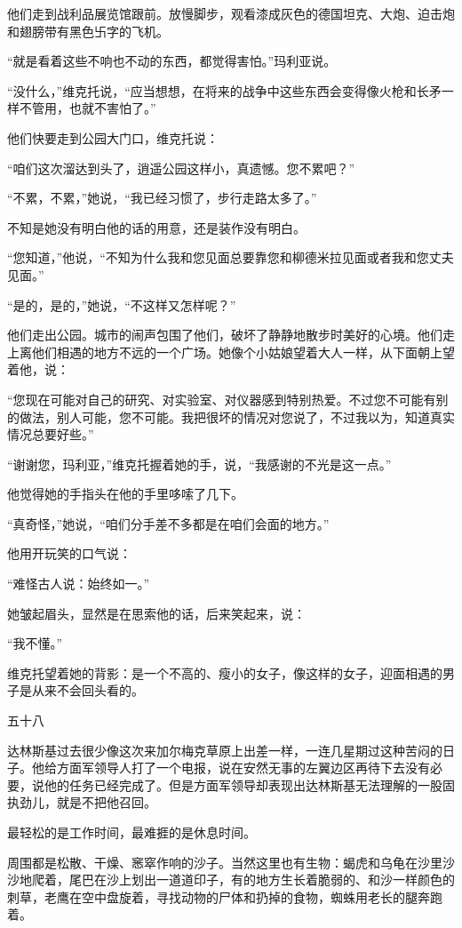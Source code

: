 他们走到战利品展览馆跟前。放慢脚步，观看漆成灰色的德国坦克、大炮、迫击炮和翅膀带有黑色卐字的飞机。

“就是看着这些不响也不动的东西，都觉得害怕。”玛利亚说。

“没什么，”维克托说，“应当想想，在将来的战争中这些东西会变得像火枪和长矛一样不管用，也就不害怕了。”

他们快要走到公园大门口，维克托说：

“咱们这次溜达到头了，逍遥公园这样小，真遗憾。您不累吧？”

“不累，不累，”她说，“我已经习惯了，步行走路太多了。”

不知是她没有明白他的话的用意，还是装作没有明白。

“您知道，”他说，“不知为什么我和您见面总要靠您和柳德米拉见面或者我和您丈夫见面。”

“是的，是的，”她说，“不这样又怎样呢？”

他们走出公园。城市的闹声包围了他们，破坏了静静地散步时美好的心境。他们走上离他们相遇的地方不远的一个广场。她像个小姑娘望着大人一样，从下面朝上望着他，说：

“您现在可能对自己的研究、对实验室、对仪器感到特别热爱。不过您不可能有别的做法，别人可能，您不可能。我把很坏的情况对您说了，不过我以为，知道真实情况总要好些。”

“谢谢您，玛利亚，”维克托握着她的手，说，“我感谢的不光是这一点。”

他觉得她的手指头在他的手里哆嗦了几下。

“真奇怪，”她说，“咱们分手差不多都是在咱们会面的地方。”

他用开玩笑的口气说：

“难怪古人说：始终如一。”

她皱起眉头，显然是在思索他的话，后来笑起来，说：

“我不懂。”

维克托望着她的背影：是一个不高的、瘦小的女子，像这样的女子，迎面相遇的男子是从来不会回头看的。

五十八

达林斯基过去很少像这次来加尔梅克草原上出差一样，一连几星期过这种苦闷的日子。他给方面军领导人打了一个电报，说在安然无事的左翼边区再待下去没有必要，说他的任务已经完成了。但是方面军领导却表现出达林斯基无法理解的一股固执劲儿，就是不把他召回。

最轻松的是工作时间，最难捱的是休息时间。

周围都是松散、干燥、窸窣作响的沙子。当然这里也有生物：蝎虎和乌龟在沙里沙沙地爬着，尾巴在沙上划出一道道印子，有的地方生长着脆弱的、和沙一样颜色的刺草，老鹰在空中盘旋着，寻找动物的尸体和扔掉的食物，蜘蛛用老长的腿奔跑着。

